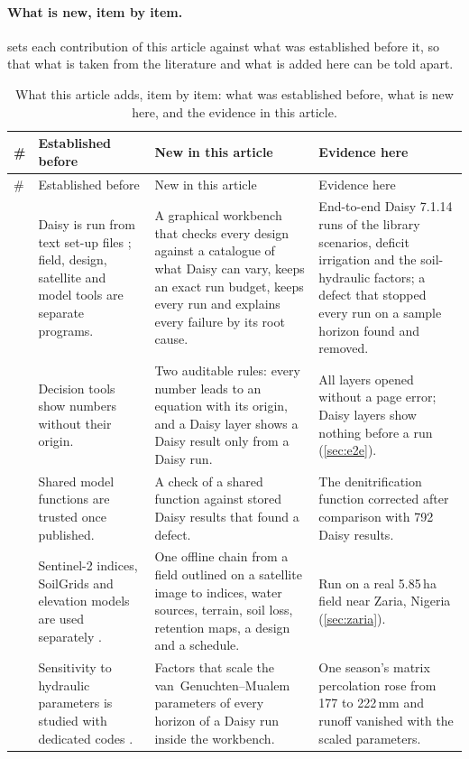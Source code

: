 \documentclass[preprint,12pt]{elsarticle}
\begin{document}
\paragraph{What is new, item by item.}  sets each contribution of this article against what was established before it, so that what is taken from the literature and what is added here can be told apart.
{\small\setlength{\tabcolsep}{4pt}
\begin{longtable}{@{}>{\raggedright\arraybackslash}p{0.4cm}>{\raggedright\arraybackslash}p{4.5cm}>{\raggedright\arraybackslash}p{5.4cm}>{\raggedright\arraybackslash}p{5.0cm}@{}}
\caption{What this article adds, item by item: what was established before, what is new here, and the evidence in this article.}\label{w:tab:novelty}\\
\toprule
\# & Established before & New in this article & Evidence here\\\midrule\endfirsthead
\toprule \# & Established before & New in this article & Evidence here\\\midrule\endhead
1 & Daisy is run from text set-up files \cite{Hansen2012}; field, design, satellite and model tools are separate programs. & A graphical workbench that checks every design against a catalogue of what Daisy can vary, keeps an exact run budget, keeps every run and explains every failure by its root cause. & End-to-end Daisy 7.1.14 runs of the library scenarios, deficit irrigation and the soil-hydraulic factors; a defect that stopped every run on a sample horizon found and removed.\\
2 & Decision tools show numbers without their origin. & Two auditable rules: every number leads to an equation with its origin, and a Daisy layer shows a Daisy result only from a Daisy run. & All layers opened without a page error; Daisy layers show nothing before a run (\cref{sec:e2e}).\\
3 & Shared model functions are trusted once published. & A check of a shared function against stored Daisy results that found a defect. & The denitrification function corrected after comparison with 792 Daisy results.\\
4 & Sentinel-2 indices, SoilGrids and elevation models are used separately \cite{Drusch2012,Poggio2021}. & One offline chain from a field outlined on a satellite image to indices, water sources, terrain, soil loss, retention maps, a design and a schedule. & Run on a real 5.85\,ha field near Zaria, Nigeria (\cref{sec:zaria}).\\
5 & Sensitivity to hydraulic parameters is studied with dedicated codes \cite{Simunek2016}. & Factors that scale the van~Genuchten--Mualem parameters of every horizon of a Daisy run inside the workbench. & One season's matrix percolation rose from 177 to 222\,mm and runoff vanished with the scaled parameters.\\

\end{longtable}}
\end{document}
